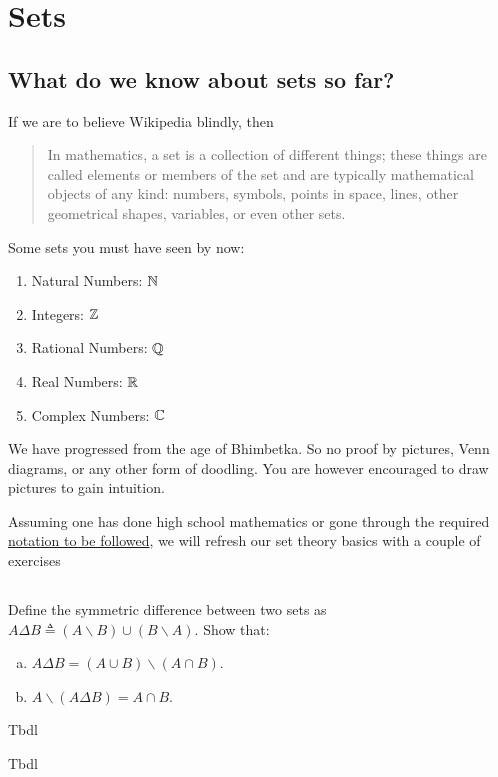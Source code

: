 \chapter{Sets}
\label{ch:sets}

\section{What do we know about sets so far?}

If we are to believe Wikipedia blindly, then
\begin{quote}
	In mathematics, a set is a collection of different things; these things are called elements or members of the set and are typically mathematical objects of any kind: numbers, symbols, points in space, lines, other geometrical shapes, variables, or even other sets.
\end{quote}

\begin{example}
	Some sets you must have seen by now:
	\begin{enumerate}
	\item Natural Numbers: $\mathbb N$
	\item Integers: $\mathbb Z$
	\item Rational Numbers: $\mathbb Q$
	\item Real Numbers: $\mathbb R$
	\item Complex Numbers: $\mathbb C$
	\end{enumerate}
\end{example}

\begin{abuse}
	We have progressed from the age of Bhimbetka. So no proof by pictures, Venn diagrams, or any other form of
	doodling. You are however encouraged to draw pictures to gain intuition.
\end{abuse}

Assuming one has done high school mathematics or gone through the required \hyperref[ch:sets_functions]{notation to be followed}, we will refresh our set theory basics with a couple of exercises

\section{\problemhead}

\begin{problem}
	 Define the symmetric difference between two sets as $A \Delta B \triangleq(A \backslash B) \cup(B \backslash A)$. Show that:
	 \begin{enumerate}[a)]
		\item $A \Delta B=(A \cup B) \backslash(A \cap B)$.
		\item $A \backslash(A \Delta B)=A \cap B$.
	\end{enumerate}
	\begin{hint}
		Tbdl
	\end{hint}
	\begin{sol}
		Tbdl
	\end{sol}
\end{problem}

